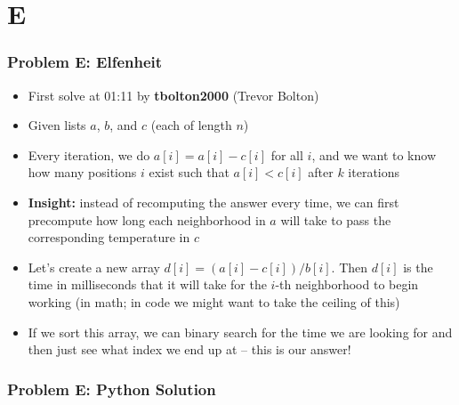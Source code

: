 \section{E}%
\label{sec:e}

\begin{frame}
  \frametitle{Problem E: Elfenheit}
  \begin{itemize}
    \item First solve at 01:11 by \textbf{tbolton2000} (Trevor Bolton)
    \item Given lists $a$, $b$, and $c$ (each of length $n$)
    \item Every iteration, we do $a[i] = a[i] - c[i]$ for all $i$, and we want to know how many
      positions $i$ exist such that $a[i] < c[i]$ after $k$ iterations
    \item \textbf{Insight:} instead of recomputing the answer every time, we can first precompute how long each
      neighborhood in $a$ will take to pass the corresponding temperature in $c$
    \item Let's create a new array $d[i] = (a[i] - c[i]) / b[i]$. Then $d[i]$ is the time in
      milliseconds that it will take for the $i$-th neighborhood to begin working (in math; in code
      we might want to take the ceiling of this)
    \item If we sort this array, we can binary search for the time we are looking for and then just see
      what index we end up at -- this is our answer!
  \end{itemize}
\end{frame}

\begin{frame}
  \frametitle{Problem E: Python Solution}
\end{frame}
